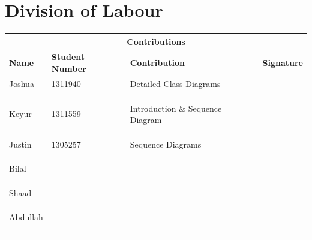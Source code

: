\documentclass[]{article}
\begin{document}
\section{Division of Labour} \label{dlabour}
\begin{tabular}{ |p{3cm}||p{2cm}|p{6cm}|p{1.5cm}|  }
 \hline
 \multicolumn{4}{|c|}{Contributions} \\
 \hline
 \textbf{Name}& \textbf{Student Number}& \textbf{Contribution}& \textbf{Signature}\\
 \hline
 Joshua & 1311940 & Detailed Class Diagrams &   \\ 
 &&&   \\
 &&&   \\
 &&&   \\
 \hline
 Keyur  & 1311559   & Introduction \& Sequence Diagram  &\\
 &&&   \\
 &&&   \\
 &&&   \\
 \hline
 Justin & 1305257 & Sequence Diagrams & \\
 &&&   \\
 &&&   \\
 &&&   \\
 \hline
 Bilal & & & \\
 &&&   \\
 &&&   \\
 &&&   \\
 \hline
 Shaad &  & &\\
 &&&   \\
 &&&   \\
 &&&   \\
 \hline
 Abdullah & &  &\\
 &&&   \\
 &&&   \\
 &&&   \\
 \hline
\end{tabular}
\end{document}
